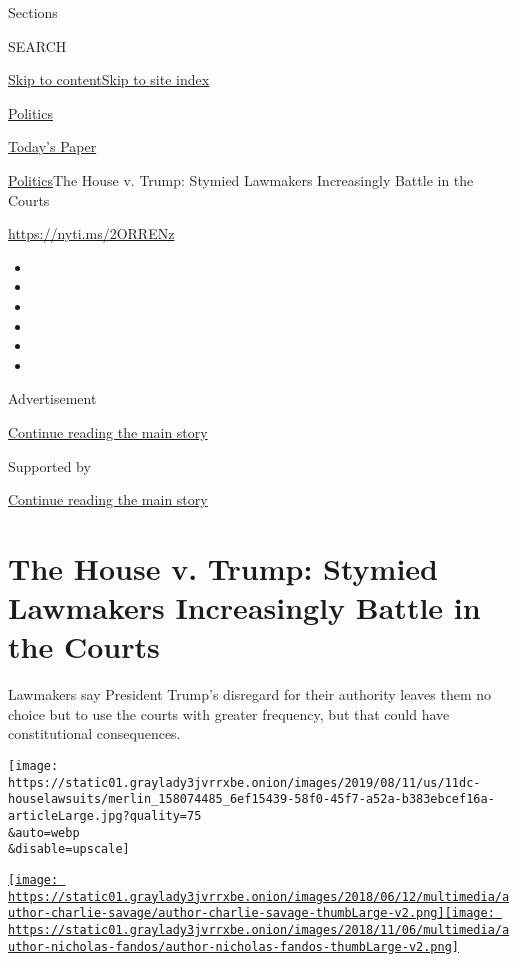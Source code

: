 Sections

SEARCH

\protect\hyperlink{site-content}{Skip to
content}\protect\hyperlink{site-index}{Skip to site index}

\href{https://www.nytimes3xbfgragh.onion/section/politics}{Politics}

\href{https://myaccount.nytimes3xbfgragh.onion/auth/login?response_type=cookie\&client_id=vi}{}

\href{https://www.nytimes3xbfgragh.onion/section/todayspaper}{Today's
Paper}

\href{/section/politics}{Politics}\textbar{}The House v. Trump: Stymied
Lawmakers Increasingly Battle in the Courts

\url{https://nyti.ms/2ORRENz}

\begin{itemize}
\item
\item
\item
\item
\item
\item
\end{itemize}

Advertisement

\protect\hyperlink{after-top}{Continue reading the main story}

Supported by

\protect\hyperlink{after-sponsor}{Continue reading the main story}

\hypertarget{the-house-v-trump-stymied-lawmakers-increasingly-battle-in-the-courts}{%
\section{The House v. Trump: Stymied Lawmakers Increasingly Battle in
the
Courts}\label{the-house-v-trump-stymied-lawmakers-increasingly-battle-in-the-courts}}

Lawmakers say President Trump's disregard for their authority leaves
them no choice but to use the courts with greater frequency, but that
could have constitutional consequences.

\texttt{[image: https://static01.graylady3jvrrxbe.onion/images/2019/08/11/us/11dc-houselawsuits/merlin\_158074485\_6ef15439-58f0-45f7-a52a-b383ebcef16a-articleLarge.jpg?quality=75\\\&auto=webp\\\&disable=upscale]}

\href{https://www.nytimes3xbfgragh.onion/by/charlie-savage}{\texttt{[image: https://static01.graylady3jvrrxbe.onion/images/2018/06/12/multimedia/author-charlie-savage/author-charlie-savage-thumbLarge-v2.png]}}\href{https://www.nytimes3xbfgragh.onion/by/nicholas-fandos}{\texttt{[image: https://static01.graylady3jvrrxbe.onion/images/2018/11/06/multimedia/author-nicholas-fandos/author-nicholas-fandos-thumbLarge-v2.png]}}

